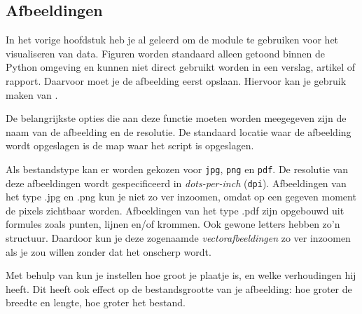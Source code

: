 \documentclass[a4paper,11pt, fleqn]{article}
\begin{document}
\subsection{Afbeeldingen}
In het vorige hoofdstuk heb je al geleerd om de module  te gebruiken voor het visualiseren van data. Figuren worden standaard alleen getoond binnen de Python omgeving en kunnen niet direct gebruikt worden in een verslag, artikel of rapport. Daarvoor moet je de afbeelding eerst opslaan. Hiervoor kan je gebruik maken van .

De belangrijkste opties die aan deze functie moeten worden meegegeven zijn de naam van de afbeelding en de resolutie. De standaard locatie waar de afbeelding wordt opgeslagen is de map waar het script is opgeslagen. 

Als bestandstype kan er worden gekozen voor \verb.jpg., \verb.png. en  \verb.pdf.. 
De resolutie van deze afbeeldingen wordt gespecificeerd in \textit{dots-per-inch}  (\verb,dpi,).
Afbeeldingen van het type .jpg en .png kun je niet zo ver inzoomen, omdat op een gegeven moment de pixels zichtbaar worden. 
Afbeeldingen van het type .pdf zijn opgebouwd uit formules zoals punten, lijnen en/of krommen. Ook gewone letters hebben zo'n structuur. Daardoor kun je deze zogenaamde \textit{vectorafbeeldingen} zo ver inzoomen als je zou willen zonder dat het onscherp wordt.

Met behulp van  kun je instellen hoe groot je plaatje is, en welke verhoudingen hij heeft. Dit heeft ook effect op de bestandsgrootte van je afbeelding: hoe groter de breedte en lengte, hoe groter het bestand.

\end{document}
